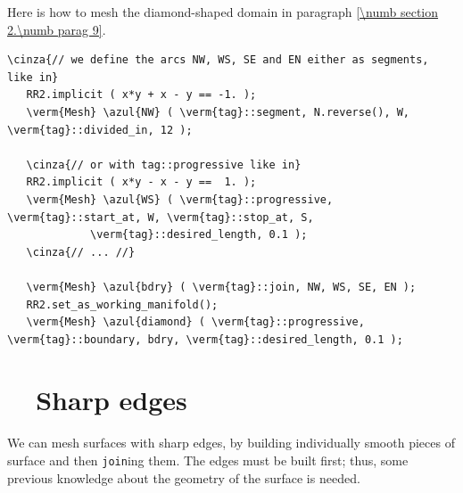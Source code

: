 Here is how to mesh the diamond-shaped domain in paragraph \ref{\numb section 2.\numb parag 9}.

\begin{Verbatim}[commandchars=\\\{\},formatcom=\small\tt,frame=single,
   label=parag-\ref{\numb section 3.\numb parag 17}.cpp,rulecolor=\color{coment},
   baselinestretch=0.94,framesep=2mm                                            ]
   \cinza{// we define the arcs NW, WS, SE and EN either as segments, like in}
   RR2.implicit ( x*y + x - y == -1. );
   \verm{Mesh} \azul{NW} ( \verm{tag}::segment, N.reverse(), W, \verm{tag}::divided_in, 12 );
   
   \cinza{// or with tag::progressive like in}
   RR2.implicit ( x*y - x - y ==  1. );
   \verm{Mesh} \azul{WS} ( \verm{tag}::progressive, \verm{tag}::start_at, W, \verm{tag}::stop_at, S,
             \verm{tag}::desired_length, 0.1 );
   \cinza{// ... //}
             
   \verm{Mesh} \azul{bdry} ( \verm{tag}::join, NW, WS, SE, EN );
   RR2.set_as_working_manifold();
   \verm{Mesh} \azul{diamond} ( \verm{tag}::progressive, \verm{tag}::boundary, bdry, \verm{tag}::desired_length, 0.1 );
\end{Verbatim}





\section{~~Sharp edges}\label{\numb section 3.\numb parag 18}

We can mesh surfaces with sharp edges, by building individually smooth pieces of surface
and then {\small\tt join}ing them.
The edges must be built first;
thus, some previous knowledge about the geometry of the surface is needed.

